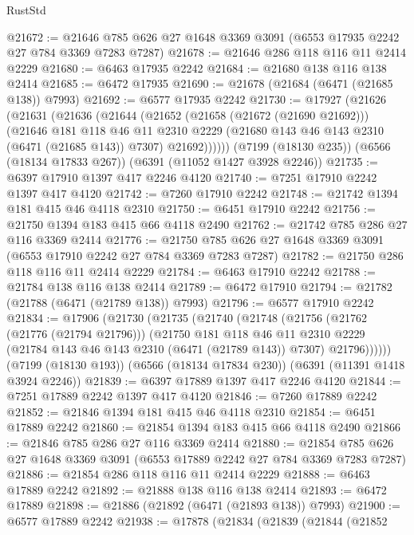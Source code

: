 \begin{lexlean}{RustStd}
\begin{coremodule}
@21672 := @21646 @785 @626 @27 @1648 @3369 @3091 (@6553 @17935 @2242 @27 @784 @3369 @7283 @7287)
@21678 := @21646 @286 @118 @116 @11 @2414 @2229
@21680 := @6463 @17935 @2242
@21684 := @21680 @138 @116 @138 @2414
@21685 := @6472 @17935
@21690 := @21678 (@21684 (@6471 (@21685 @138)) @7993)
@21692 := @6577 @17935 @2242
@21730 := @17927
    (@21626
      (@21631
        (@21636
          (@21644
            (@21652
              (@21658 (@21672 (@21690 @21692)))
              (@21646
                @181
                @118
                @46
                @11
                @2310
                @2229
                (@21680 @143 @46 @143 @2310 (@6471 (@21685 @143)) @7307)
                @21692))))))
    (@7199 (@18130 @235))
    (@6566 (@18134 @17833 @267))
    (@6391 (@11052 @1427 @3928 @2246))
@21735 := @6397 @17910 @1397 @417 @2246 @4120
@21740 := @7251 @17910 @2242 @1397 @417 @4120
@21742 := @7260 @17910 @2242
@21748 := @21742 @1394 @181 @415 @46 @4118 @2310
@21750 := @6451 @17910 @2242
@21756 := @21750 @1394 @183 @415 @66 @4118 @2490
@21762 := @21742 @785 @286 @27 @116 @3369 @2414
@21776 := @21750 @785 @626 @27 @1648 @3369 @3091 (@6553 @17910 @2242 @27 @784 @3369 @7283 @7287)
@21782 := @21750 @286 @118 @116 @11 @2414 @2229
@21784 := @6463 @17910 @2242
@21788 := @21784 @138 @116 @138 @2414
@21789 := @6472 @17910
@21794 := @21782 (@21788 (@6471 (@21789 @138)) @7993)
@21796 := @6577 @17910 @2242
@21834 := @17906
    (@21730
      (@21735
        (@21740
          (@21748
            (@21756
              (@21762 (@21776 (@21794 @21796)))
              (@21750
                @181
                @118
                @46
                @11
                @2310
                @2229
                (@21784 @143 @46 @143 @2310 (@6471 (@21789 @143)) @7307)
                @21796))))))
    (@7199 (@18130 @193))
    (@6566 (@18134 @17834 @230))
    (@6391 (@11391 @1418 @3924 @2246))
@21839 := @6397 @17889 @1397 @417 @2246 @4120
@21844 := @7251 @17889 @2242 @1397 @417 @4120
@21846 := @7260 @17889 @2242
@21852 := @21846 @1394 @181 @415 @46 @4118 @2310
@21854 := @6451 @17889 @2242
@21860 := @21854 @1394 @183 @415 @66 @4118 @2490
@21866 := @21846 @785 @286 @27 @116 @3369 @2414
@21880 := @21854 @785 @626 @27 @1648 @3369 @3091 (@6553 @17889 @2242 @27 @784 @3369 @7283 @7287)
@21886 := @21854 @286 @118 @116 @11 @2414 @2229
@21888 := @6463 @17889 @2242
@21892 := @21888 @138 @116 @138 @2414
@21893 := @6472 @17889
@21898 := @21886 (@21892 (@6471 (@21893 @138)) @7993)
@21900 := @6577 @17889 @2242
@21938 := @17878
    (@21834
      (@21839
        (@21844
          (@21852

\end{coremodule}
\end{lexlean}

